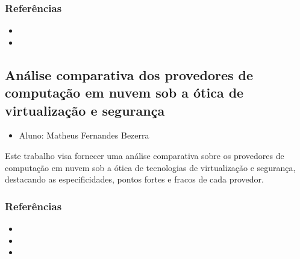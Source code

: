 \documentclass{article}
\newcommand*{\nsubsection}[1]{
    \subsection{#1}
}
\begin{document}
\subsubsection*{Referências}
\begin{itemize}
	\item {}	
	\item {}
\end{itemize}

\nsubsection{Análise comparativa dos provedores de computação em nuvem sob a ótica de virtualização e segurança}

\begin{itemize}
	\item Aluno: Matheus Fernandes Bezerra
\end{itemize}


Este trabalho visa fornecer uma análise comparativa sobre os provedores de computação em nuvem sob a ótica de tecnologias de virtualização e segurança, destacando as especificidades, pontos fortes e fracos de cada provedor.




\subsubsection*{Referências}
\begin{itemize}
	\item {}	
	\item {}
	\item {}
\end{itemize}





\end{document}
